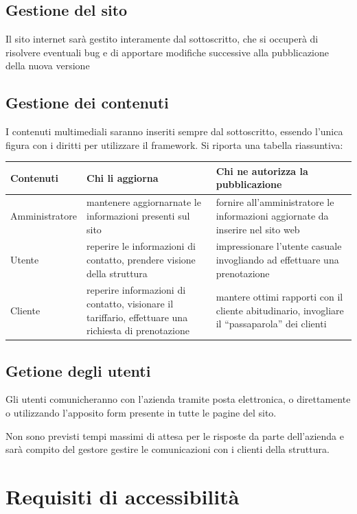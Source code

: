 \documentclass[a4paper,12pt,hidelinks]{report}
\begin{document}
  \subsection{Gestione del sito}
  Il sito internet sarà gestito interamente dal sottoscritto, che si occuperà di risolvere eventuali bug e di apportare modifiche successive alla pubblicazione della nuova versione	
  \subsection{Gestione dei contenuti}
  I contenuti multimediali saranno inseriti sempre dal sottoscritto, essendo l'unica figura con i diritti per utilizzare il framework.
  Si riporta una tabella riassuntiva:
  \begin{center}
    \begin{tabular}{||m{4cm}|m{4cm}|m{4cm}||}
      \hline
	\textbf{Contenuti} & \textbf{Chi li aggiorna} & \textbf{Chi ne autorizza la pubblicazione}\\
      \hline
	Amministratore & mantenere aggiornarnate le informazioni presenti sul sito & fornire all'amministratore le informazioni aggiornate da inserire nel sito web\\
      \hline
	Utente & reperire le informazioni di contatto, prendere visione della struttura
	      & impressionare l'utente casuale invogliando ad effettuare una prenotazione\\
      \hline  
	Cliente & reperire informazioni di contatto, visionare il tariffario, effettuare una richiesta di prenotazione & mantere ottimi rapporti con
	il cliente abitudinario, invogliare il ``passaparola'' dei clienti \\
      \hline
    \end{tabular}
  \end{center}
  \subsection{Getione degli utenti}
  Gli utenti comunicheranno con l'azienda tramite posta elettronica, o direttamente o utilizzando l'apposito form presente in tutte le pagine del sito.
  \par Non sono previsti tempi massimi di attesa per le risposte da parte dell'azienda e sarà compito del gestore gestire le comunicazioni con i clienti della struttura.

\section{Requisiti di accessibilità}
\end{document}
